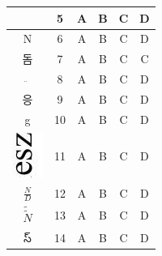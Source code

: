 \documentclass[10pt]{article}
\begin{document}
\begin{center}
\begin{tabular}{|c|c|c|c|c|c|}
 & 5 & A & B & C & D \\
\hline
N & 6 & A & B & C & D \\
\hline
돔 & 7 & A & B & C & C \\
\hline
\( \ddot{~} \) & 8 & A & B & C & D \\
\hline
응 & 9 & A & B & C & D \\
\hline
g & 10 & A & B & C & D \\
\hline
\includegraphics[max width=\textwidth]{2024_11_21_1e89351873aa60c4c1b9g-23}
 & 11 & A & B & C & D \\
\hline
\( \frac{N}{D} \) & 12 & A & B & C & D \\
\hline
\( \tilde{\tilde{N}} \) & 13 & A & B & C & D \\
\hline
స్ & 14 & A & B & C & D \\
\hline

\end{tabular}
\end{center}
\end{document}
